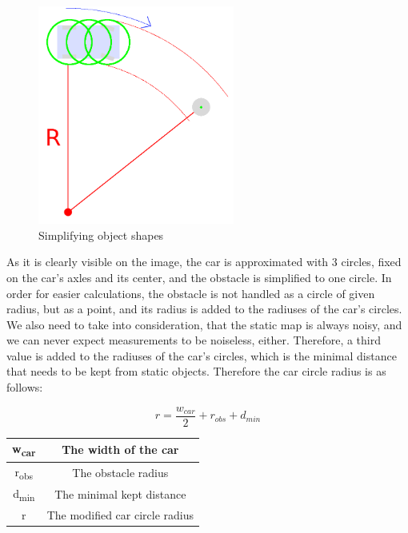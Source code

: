 \begin{figure}[!ht]
    \centering
    \includegraphics[height=72mm]{figures/raw/static_collision_time_check_object_simplification.png}
    \caption{Simplifying object shapes}
    \label{static_collision_time_check_object_simplification}
\end{figure}

As it is clearly visible on the image, the car is approximated with 3 circles, fixed on the car's axles and its center, and the obstacle is simplified to one circle. In order for easier calculations, the obstacle is not handled as a circle of given radius, but as a point, and its radius is added to the radiuses of the car's circles. We also need to take into consideration, that the static map is always noisy, and we can never expect measurements to be noiseless, either. Therefore, a third value is added to the radiuses of the car's circles, which is the minimal distance that needs to be kept from static objects. Therefore the car circle radius is as follows:

\[ r = \frac{w_{car}}{2} + r_{obs} + d_{min} \]

\begin{center}
    \begin{tabular}{ | c | c | }
        \hline
        w\textsubscript{car}  	& The width of the car            	\\
        \hline
        r\textsubscript{obs}  	& The obstacle radius         	    \\
        \hline 
        d\textsubscript{min}    & The minimal kept distance      	\\
        \hline 
        r       				& The modified car circle radius    \\
        \hline
    \end{tabular}
\end{center}

